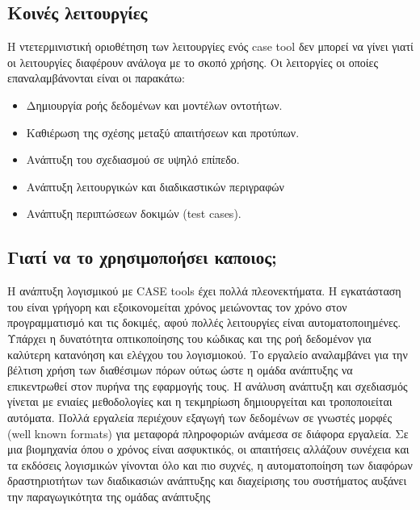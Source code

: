 \subsection{Kοινές λειτουργίες}
Η ντετερμινιστική οριοθέτηση των λειτουργίες ενός case tool δεν μπορεί να γίνει γιατί οι λειτουργίες διαφέρουν ανάλογα με το σκοπό χρήσης. Οι λειτοργίες οι οποίες επαναλαμβάνονται είναι οι παρακάτω:
\begin{itemize}
	\item Δημιουργία ροής δεδομένων και μοντέλων οντοτήτων.
	\item Καθιέρωση της σχέσης μεταξύ απαιτήσεων και προτύπων.
	\item Ανάπτυξη του σχεδιασμού σε υψηλό επίπεδο.
	\item Ανάπτυξη λειτουργικών και διαδικαστικών περιγραφών
	\item Ανάπτυξη περιπτώσεων δοκιμών (test cases).	
\end{itemize}

\subsection{Γιατί να το χρησιμοποήσει καποιος;}
H ανάπτυξη λογισμικού με CASE tools έχει πολλά πλεονεκτήματα. Η εγκατάσταση του είναι γρήγορη και εξοικονομείται χρόνος μειώνοντας τον χρόνο στον προγραμματισμό και τις δοκιμές, αφού πολλές λειτουργίες είναι αυτοματοποιημένες. Υπάρχει η δυνατότητα οπτικοποίησης του κώδικας και της ροή δεδομένον για καλύτερη κατανόηση και ελέγχου του λογισμιοκού. Το εργαλείο αναλαμβάνει για την βέλτιση χρήση των διαθέσιμων πόρων ούτως ώστε η ομάδα ανάπτυξης να επικεντρωθεί στον πυρήνα της εφαρμογής τους. Η ανάλυση ανάπτυξη και σχεδιασμός γίνεται με ενιαίες μεθοδολογίες και η τεκμηρίωση δημιουργείται και τροποποιείται αυτόματα. Πολλά εργαλεία περιέχουν εξαγωγή των δεδομένων σε γνωστές μορφές (well known formats) για μεταφορά πληροφοριών ανάμεσα σε διάφορα εργαλεία. Σε μια βιομηχανία όπου ο χρόνος είναι ασφυκτικός, οι απαιτήσεις αλλάζουν συνέχεια και τα εκδόσεις λογισμικών γίνονται όλο και πιο συχνές, η αυτοματοποίηση των διαφόρων δραστηριοτήτων των διαδικασιών ανάπτυξης και διαχείρισης του συστήματος αυξάνει την παραγωγικότητα της ομάδας ανάπτυξης 

